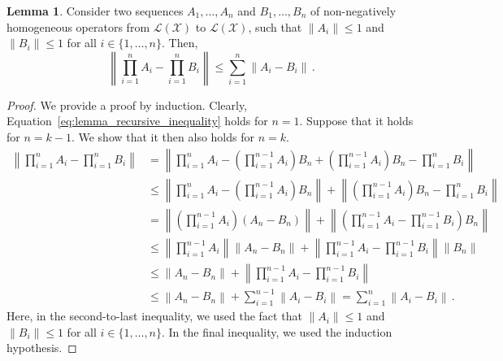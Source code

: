 \documentclass[10pt]{paper}
\theoremstyle{definition}
\newtheorem{lemma}[theorem]{Lemma}
\newcommand{\states}{\mathcal{X}}
\newcommand{\gambles}{\mathcal{L}}
\newcommand{\gamblesX}{\gambles(\states)}
\newcommand{\norm}[1]{\left\lVert #1 \right\rVert}
\begin{document}
\begin{lemma}\label{lemma:recursive}
Consider two sequences $A_1,\ldots,A_n$ and $B_1,\ldots,B_n$ of non-negatively homogeneous operators from $\gamblesX$ to $\gamblesX$, such that $\norm{A_i}\leq 1$ and $\norm{B_i}\leq 1$ for all $i\in\{1,\ldots,n\}$. Then,
\begin{equation}\label{eq:lemma_recursive_inequality}
\norm{\prod_{i=1}^nA_i - \prod_{i=1}^nB_i} \leq \sum_{i=1}^n \norm{A_i - B_i}\,.
\end{equation}
\end{lemma}
\begin{proof}
We provide a proof by induction. Clearly, Equation~\eqref{eq:lemma_recursive_inequality} holds for $n=1$. Suppose that it holds for $n=k-1$. We show that it then also holds for $n=k$.
\begin{align*}
\norm{\prod_{i=1}^nA_i - \prod_{i=1}^nB_i} &= \norm{\prod_{i=1}^nA_i - \left(\prod_{i=1}^{n-1}A_i\right)B_n + \left(\prod_{i=1}^{n-1}A_i\right)B_n - \prod_{i=1}^nB_i} \\
 &\leq \norm{\prod_{i=1}^nA_i - \left(\prod_{i=1}^{n-1}A_i\right)B_n} + \norm{\left(\prod_{i=1}^{n-1}A_i\right)B_n - \prod_{i=1}^nB_i} \\
 &= \norm{\left(\prod_{i=1}^{n-1}A_i\right)(A_n - B_n)} + \norm{\left(\prod_{i=1}^{n-1}A_i - \prod_{i=1}^{n-1}B_i\right)B_n} \\
 &\leq \norm{\prod_{i=1}^{n-1}A_i}\norm{A_n - B_n} + \norm{\prod_{i=1}^{n-1}A_i - \prod_{i=1}^{n-1}B_i}\norm{B_n} \\
 &\leq \norm{A_n - B_n} + \norm{\prod_{i=1}^{n-1}A_i - \prod_{i=1}^{n-1}B_i} \\
 &\leq \norm{A_n - B_n} + \sum_{i=1}^{n-1}\norm{A_i - B_i} = \sum_{i=1}^{n}\norm{A_i - B_i}\,.
\end{align*}
Here, in the second-to-last inequality, we used the fact that $\norm{A_i}\leq 1$ and $\norm{B_i}\leq 1$ for all $i\in\{1,\ldots,n\}$. In the final inequality, we used the induction hypothesis.
\end{proof}
\end{document}
